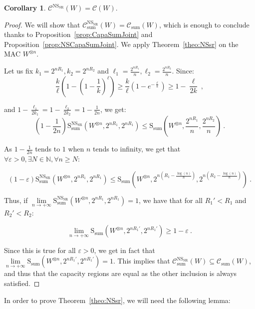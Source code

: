 \documentclass[11pt]{article}
\theoremstyle{definition}
\newtheorem{cor}[theo]{Corollary}
\theoremstyle{remark}
\begin{document}
\begin{cor}
  \label{cor:NSsr}
  $\mathcal{C}^{\mathrm{NS}_{\mathrm{SR}}}(W)=\mathcal{C}(W)$.
\end{cor}
\begin{proof}
  We will show that $\mathcal{C}_{\text{sum}}^{\mathrm{NS}_{\mathrm{SR}}}(W)=\mathcal{C}_{\text{sum}}(W)$, which is enough to conclude thanks to Proposition~\ref{prop:CapaSumJoint} and Proposition~\ref{prop:NSCapaSumJoint}. We apply Theorem~\ref{theo:NSsr} on the MAC $W^{\otimes n}$.

  Let us fix $k_1=2^{nR_1},k_2=2^{nR_2}$ and $\ell_1=\frac{2^{nR_1}}{n},\ell_2=\frac{2^{nR_2}}{n}$. Since:
  \[ \frac{k}{\ell}\left(1-\left(1-\frac{1}{k}\right)^{\ell}\right) \geq \frac{k}{\ell}\left(1-e^{-\frac{\ell}{k}}\right) \geq 1 - \frac{\ell}{2k} \ ,\]

  and $1 - \frac{\ell_1}{2k_1} = 1 - \frac{\ell_2}{2k_2} = 1 - \frac{1}{2n}$, we get:
\[ \left(1-\frac{1}{2n}\right)\mathrm{S}_{\text{sum}}^{\mathrm{NS}_{\mathrm{SR}}}(W^{\otimes n},2^{nR_1},2^{nR_1}) \leq \mathrm{S}_{\text{sum}}\left(W^{\otimes n},\frac{2^{nR_1}}{n},\frac{2^{nR_2}}{n}\right)\ . \]

  As $1-\frac{1}{2n}$ tends to $1$ when $n$ tends to infinity, we get that $\forall \varepsilon > 0, \exists N \in \mathbb{N}, \forall n\geq N$:

  \[(1-\varepsilon)\mathrm{S}_{\text{sum}}^{\mathrm{NS}_{\mathrm{SR}}}(W^{\otimes n},2^{nR_1},2^{nR_1}) \leq \mathrm{S}_{\text{sum}}(W^{\otimes n},2^{n(R_1-\frac{\log(n)}{n})},2^{n(R_2-\frac{\log(n)}{n})}) \ . \]

Thus, if $\underset{n \rightarrow +\infty}{\lim} \mathrm{S}_{\text{sum}}^{\mathrm{NS}_{\mathrm{SR}}}(W^{\otimes n},2^{nR_1},2^{nR_1})  = 1$, we have that for all $R_1'<R_1$ and $R_2'<R_2$:

\[ \underset{n \rightarrow +\infty}{\lim} \mathrm{S}_{\text{sum}}(W^{\otimes n},2^{nR_1'},2^{nR_1'}) \geq 1-\varepsilon \ . \]

Since this is true for all $\varepsilon > 0$, we get in fact that $\underset{n \rightarrow +\infty}{\lim} \mathrm{S}_{\text{sum}}(W^{\otimes n},2^{nR_1'},2^{nR_1'}) = 1$. This implies that $\mathcal{C}_{\text{sum}}^{\mathrm{NS}_{\mathrm{SR}}}(W) \subseteq \mathcal{C}_{\text{sum}}(W)$, and thus that the capacity regions are equal as the other inclusion is always satisfied.
\end{proof}

In order to prove Theorem~\ref{theo:NSsr}, we will need the following lemma:
\end{document}

